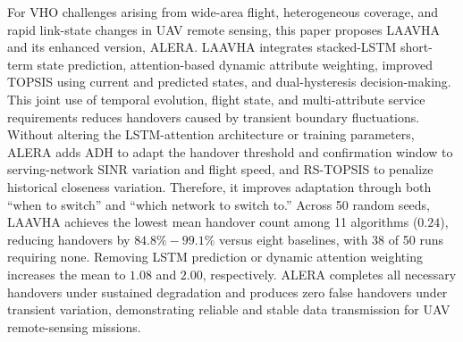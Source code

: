 \documentclass[10pt,a4paper]{article}
\begin{document}
For VHO challenges arising from wide-area flight, heterogeneous coverage, and rapid link-state changes in UAV remote sensing, this paper proposes LAAVHA and its enhanced version, ALERA. LAAVHA integrates stacked-LSTM short-term state prediction, attention-based dynamic attribute weighting, improved TOPSIS using current and predicted states, and dual-hysteresis decision-making. This joint use of temporal evolution, flight state, and multi-attribute service requirements reduces handovers caused by transient boundary fluctuations. Without altering the LSTM-attention architecture or training parameters, ALERA adds ADH to adapt the handover threshold and confirmation window to serving-network SINR variation and flight speed, and RS-TOPSIS to penalize historical closeness variation. Therefore, it improves adaptation through both ``when to switch'' and ``which network to switch to.'' Across 50 random seeds, LAAVHA achieves the lowest mean handover count among 11 algorithms ($0.24$), reducing handovers by $84.8\%-99.1\%$ versus eight baselines, with 38 of 50 runs requiring none. Removing LSTM prediction or dynamic attention weighting increases the mean to $1.08$ and $2.00$, respectively. ALERA completes all necessary handovers under sustained degradation and produces zero false handovers under transient variation, demonstrating reliable and stable data transmission for UAV remote-sensing missions.
\end{document}
